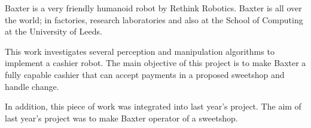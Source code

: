 Baxter is a very friendly humanoid robot by Rethink Robotics. Baxter is all over the
world; in factories, research laboratories and also at the School of Computing at the
University of Leeds.

This work investigates several perception and manipulation algorithms to implement a
cashier robot. The main objective of this project is to make Baxter a fully capable cashier
that can accept payments in a proposed sweetshop and handle change.

In addition, this piece of work was integrated into last year’s project. The aim of last
year’s project was to make Baxter operator of a sweetshop.